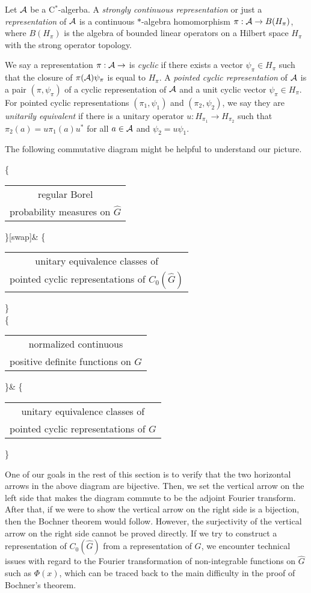 \documentclass[a4paper]{article}
\begin{document}
\begin{defn}
Let $\mathcal{A}$ be a C$^*$-algerba.
A \emph{strongly continuous representation} or just a \emph{representation} of $\mathcal{A}$ is a continuous $*$-algebra homomorphism $\pi:\mathcal{A}\to B(H_\pi)$, where $B(H_\pi)$ is the algebra of bounded linear operators on a Hilbert space $H_\pi$ with the strong operator topology.

We say a representation $\pi:\mathcal{A}\to$ is \emph{cyclic} if there exists a vector $\psi_\pi\in H_\pi$ such that the closure of $\pi(\mathcal{A})\psi_\pi$ is equal to $H_\pi$.
A \emph{pointed cyclic representation} of $\mathcal{A}$ is a pair $(\pi,\psi_\pi)$ of a cyclic representation of $\mathcal{A}$ and a unit cyclic vector $\psi_\pi\in H_\pi$.
For pointed cyclic representations $(\pi_1,\psi_1)$ and $(\pi_2,\psi_2)$, we say they are \emph{unitarily equivalent} if there is a unitary operator $u:H_{\pi_1}\to H_{\pi_2}$ such that $\pi_2(a)=u\pi_1(a)u^*$ for all $a\in\mathcal{A}$ and $\psi_2=u\psi_1$.
\end{defn}

The following commutative diagram might be helpful to understand our picture.
\begin{cd}
\left\{\begin{tabular}{c}regular Borel\\probability measures on $\hat G$\end{tabular}\right\}[swap]{}&
\left\{\begin{tabular}{c}unitary equivalence classes of\\pointed cyclic representations of $C_0(\hat G)$\end{tabular}\right\}\\
\left\{\begin{tabular}{c}normalized continuous\\positive definite functions on $G$\end{tabular}\right\}&
\left\{\begin{tabular}{c}unitary equivalence classes of\\pointed cyclic representations of $G$\end{tabular}\right\}
\end{cd}
One of our goals in the rest of this section is to verify that the two horizontal arrows in the above diagram are bijective.
Then, we set the vertical arrow on the left side that makes the diagram commute to be the adjoint Fourier transform.
After that, if we were to show the vertical arrow on the right side is a bijection, then the Bochner theorem would follow.
However, the surjectivity of the vertical arrow on the right side cannot be proved directly.
If we try to construct a representation of $C_0(\hat G)$ from a representation of $G$, we encounter technical issues with regard to the Fourier transformation of non-integrable functions on $\hat G$ such as $\Phi(x)$, which can be traced back to the main difficulty in the proof of Bochner's theorem.
\end{document}
